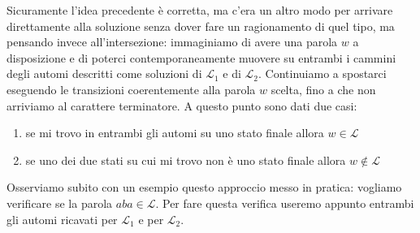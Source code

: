 \documentclass[class=book, crop=false, oneside, 12pt]{standalone}
\begin{document}
Sicuramente l'idea precedente è corretta, ma c'era un altro modo per arrivare direttamente alla soluzione senza dover fare un ragionamento di quel tipo, ma pensando invece all'intersezione: immaginiamo di avere una parola \(w\) a disposizione e di poterci contemporaneamente muovere su entrambi i cammini degli automi descritti come soluzioni di \(\mathcal{L}_1\) e di \(\mathcal{L}_2\). Continuiamo a spostarci eseguendo le transizioni coerentemente alla parola \(w\) scelta, fino a che non arriviamo al carattere terminatore. A questo punto sono dati due casi:
\begin{enumerate}
    \item se mi trovo in entrambi gli automi su uno stato finale allora \(w \in \mathcal{L}\)
    \item se uno dei due stati su cui mi trovo non è uno stato finale allora \(w \notin \mathcal{L}\)
\end{enumerate}
Osserviamo subito con un esempio questo approccio messo in pratica: vogliamo verificare se la parola \(aba \in \mathcal{L}\).
Per fare questa verifica useremo appunto entrambi gli automi ricavati per \(\mathcal{L}_1\) e per \(\mathcal{L}_2\).
\end{document}
